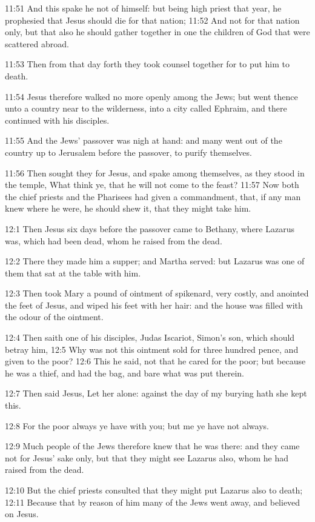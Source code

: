 11:51 And this spake he not of himself: but being high priest that year, he prophesied that Jesus should die for that nation; 11:52 And not for that nation only, but that also he should gather together in one the children of God that were scattered abroad.

11:53 Then from that day forth they took counsel together for to put him to death.

11:54 Jesus therefore walked no more openly among the Jews; but went thence unto a country near to the wilderness, into a city called Ephraim, and there continued with his disciples.

11:55 And the Jews' passover was nigh at hand: and many went out of the country up to Jerusalem before the passover, to purify themselves.

11:56 Then sought they for Jesus, and spake among themselves, as they stood in the temple, What think ye, that he will not come to the feast?  11:57 Now both the chief priests and the Pharisees had given a commandment, that, if any man knew where he were, he should shew it, that they might take him.

12:1 Then Jesus six days before the passover came to Bethany, where Lazarus was, which had been dead, whom he raised from the dead.

12:2 There they made him a supper; and Martha served: but Lazarus was one of them that sat at the table with him.

12:3 Then took Mary a pound of ointment of spikenard, very costly, and anointed the feet of Jesus, and wiped his feet with her hair: and the house was filled with the odour of the ointment.

12:4 Then saith one of his disciples, Judas Iscariot, Simon's son, which should betray him, 12:5 Why was not this ointment sold for three hundred pence, and given to the poor?  12:6 This he said, not that he cared for the poor; but because he was a thief, and had the bag, and bare what was put therein.

12:7 Then said Jesus, Let her alone: against the day of my burying hath she kept this.

12:8 For the poor always ye have with you; but me ye have not always.

12:9 Much people of the Jews therefore knew that he was there: and they came not for Jesus' sake only, but that they might see Lazarus also, whom he had raised from the dead.

12:10 But the chief priests consulted that they might put Lazarus also to death; 12:11 Because that by reason of him many of the Jews went away, and believed on Jesus.

